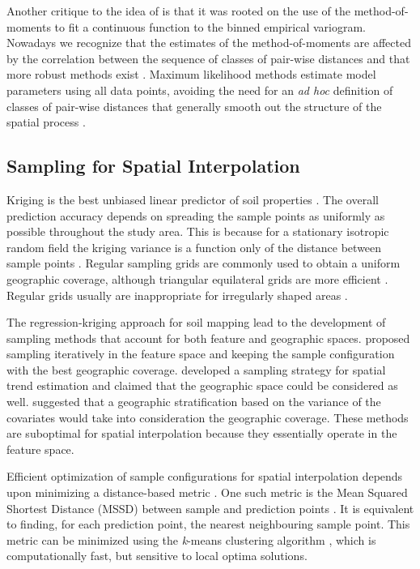 Another critique to the idea of \citet{BreslerEtAl1982, Russo1984, WarrickEtAl1987} is that it was rooted on 
the use of the method-of-moments to fit a continuous function to the binned empirical variogram. Nowadays we 
recognize that the estimates of the method-of-moments are affected by the correlation between the sequence 
of classes of pair-wise distances and that more robust methods exist \cite{DiggleEtAl2002}. Maximum 
likelihood methods estimate model parameters using all data points, avoiding the need for an \textit{ad hoc} 
definition of classes of pair-wise distances that generally smooth out the structure of the spatial process  
\cite{Lark2000}.

\subsection{Sampling for Spatial Interpolation}

Kriging is the best unbiased linear predictor of soil properties \cite{LarkEtAl2006}. The overall prediction 
accuracy depends on spreading the sample points as uniformly as possible throughout the study area. This is 
because for a stationary isotropic random field the kriging variance is a function only of the distance 
between 
sample points \cite{Cressie1993}. Regular sampling grids are commonly used to obtain a uniform geographic 
coverage, although triangular equilateral grids are more efficient \cite{WebsterEtAl2007}. Regular grids 
usually are inappropriate for irregularly shaped areas \cite{WalvoortEtAl2010}.

The regression-kriging approach for soil mapping \cite{HenglEtAl2007b} lead to the development of sampling 
methods that account for both feature and geographic spaces. \citet{HenglEtAl2003a} proposed sampling 
iteratively in the feature space and keeping the sample configuration with the best geographic coverage. 
\citet{MinasnyEtAl2006b} developed a sampling strategy for spatial trend estimation and claimed that the 
geographic space could be considered as well. \citet{MinasnyEtAl2007a} suggested that a geographic 
stratification based on the variance of the covariates would take into consideration the geographic coverage. 
These methods are suboptimal for spatial interpolation because they essentially operate in the feature space.

Efficient optimization of sample configurations for spatial interpolation depends upon minimizing a 
distance-based metric \cite{RoyleEtAl1998}. One such metric is the Mean Squared Shortest Distance (MSSD) 
between sample and prediction points \cite{BrusEtAl2006}. It is equivalent to finding, for each prediction 
point, the nearest neighbouring sample point. This metric can be minimized using the \textit{k}-means 
clustering algorithm \cite{WalvoortEtAl2010}, which is computationally fast, but sensitive to local optima 
solutions.

